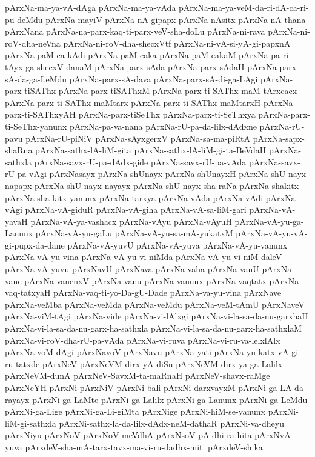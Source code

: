 {pArxNa-ma-ya-vA-dAga
pArxNa-ma-ya-vAda
pArxNa-ma-ya-veM-da-ri-dA-ca-ri-pu-deMdu
pArxNa-mayiV
pArxNa-nA-gipapx
pArxNa-nAsitx
pArxNa-nA-thana
pArxNana
pArxNa-na-parx-kaq-ti-parx-veV-sha-doLu
pArxNa-ni-rava
pArxNa-ni-roV-dha-neVna
pArxNa-ni-roV-dha-shecxVtf
pArxNa-ni-vA-si-yA-gi-papxnA
pArxNa-paM-ca-kAdi
pArxNa-paM-caka
pArxNa-paM-cakaM
pArxNa-pa-ri-tAyx-ga-shecxV-danaM
pArxNa-parx-sAda
pArxNa-parx-sAdaH
pArxNa-parx-sA-da-ga-LeMdu
pArxNa-parx-sA-dava
pArxNa-parx-sA-di-ga-LAgi
pArxNa-parx-tiSAThx
pArxNa-parx-tiSAThxM
pArxNa-parx-ti-SAThx-maM-tArxcacx
pArxNa-parx-ti-SAThx-maMtarx
pArxNa-parx-ti-SAThx-maMtarxH
pArxNa-parx-ti-SAThxyAH
pArxNa-parx-tiSeThx
pArxNa-parx-ti-SeThxya
pArxNa-parx-ti-SeThx-yanunx
pArxNa-pa-va-nana
pArxNa-rU-pa-da-lilx-dAdxne
pArxNa-rU-pavu
pArxNa-rU-piNiV
pArxNa-sAyxgerxV
pArxNa-sa-ma-piRtA
pArxNa-sapx-shaRna
pArxNa-sathx-lA-liM-gita
pArxNa-sathx-lA-liM-gi-ta-BeVdaH
pArxNa-sathxla
pArxNa-savx-rU-pa-dAdx-gide
pArxNa-savx-rU-pa-vAda
pArxNa-savx-rU-pa-vAgi
pArxNasayx
pArxNa-shUnayx
pArxNa-shUnayxH
pArxNa-shU-nayx-napapx
pArxNa-shU-nayx-nayayx
pArxNa-shU-nayx-sha-raNa
pArxNa-shakitx
pArxNa-sha-kitx-yanunx
pArxNa-tarxya
pArxNa-vAda
pArxNa-vAdi
pArxNa-vAgi
pArxNa-vA-giduR
pArxNa-vA-giha
pArxNa-vA-sa-liM-gari
pArxNa-vA-yavaH
pArxNa-vA-ya-vashacx
pArxNa-vAyu
pArxNa-vAyuH
pArxNa-vA-yu-ga-Lanunx
pArxNa-vA-yu-gaLu
pArxNa-vA-yu-sa-mA-yukatxM
pArxNa-vA-yu-vA-gi-pupx-da-dane
pArxNa-vA-yuvU
pArxNa-vA-yuva
pArxNa-vA-yu-vanunx
pArxNa-vA-yu-vina
pArxNa-vA-yu-vi-niMda
pArxNa-vA-yu-vi-niM-daleV
pArxNa-vA-yuvu
pArxNavU
pArxNava
pArxNa-vaha
pArxNa-vanU
pArxNa-vane
pArxNa-vanenxV
pArxNa-vanu
pArxNa-vanunx
pArxNa-vaqtatx
pArxNa-vaq-tatxyaH
pArxNa-vaq-ti-yo-Da-gU-Dade
pArxNa-va-yu-vina
pArxNave
pArxNa-veMba
pArxNa-veMda
pArxNa-veMdu
pArxNa-veM-tAmU
pArxNaveV
pArxNa-viM-tAgi
pArxNa-vide
pArxNa-vi-lAlxgi
pArxNa-vi-la-sa-da-nu-garxhaH
pArxNa-vi-la-sa-da-nu-garx-ha-sathxla
pArxNa-vi-la-sa-da-nu-garx-ha-sathxlaM
pArxNa-vi-roV-dha-rU-pa-vAda
pArxNa-vi-ruva
pArxNa-vi-ru-va-lelxlAlx
pArxNa-voM-dAgi
pArxNavoV
pArxNavu
pArxNa-yati
pArxNa-yu-katx-vA-gi-ru-tatxde
pArxNeV
pArxNeVM-dirx-yA-diSu
pArxNeVM-dirx-ya-ga-Lalilx
pArxNeVM-dunA
pArxNeV-SavxM-ta-maRnaH
pArxNeV-shavx-raMge
pArxNeYH
pArxNi
pArxNiV
pArxNi-bali
pArxNi-darxvayxM
pArxNi-ga-LA-da-rayayx
pArxNi-ga-LaMte
pArxNi-ga-Lalilx
pArxNi-ga-Lanunx
pArxNi-ga-LeMdu
pArxNi-ga-Lige
pArxNi-ga-Li-giMta
pArxNige
pArxNi-hiM-se-yanunx
pArxNi-liM-gi-sathxla
pArxNi-sathx-la-da-lilx-dAdx-neM-dathaR
pArxNi-va-dheyu
pArxNiyu
pArxNoV
pArxNoV-meVdhA
pArxNsoV-pA-dhi-ra-hita
pArxNvA-yuva
pArxdeV-sha-mA-tarx-tavx-ma-vi-ru-dadhx-miti
pArxdeV-shika
}

